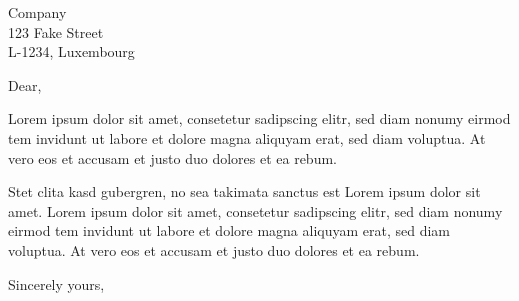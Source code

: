 \documentclass[DIN, pagenumber=false, parskip=half,%
               fromalign=right, 
               fromrule=false,fromlogo]{scrlttr2}
\begin{document}
 
\begin{letter}{ Company \\ 123 Fake Street \\ L-1234, Luxembourg}


\opening{Dear,}

Lorem ipsum dolor sit amet, consetetur sadipscing elitr, sed diam nonumy eirmod tem 
invidunt ut labore et dolore magna aliquyam erat, sed diam voluptua. At vero eos et accusam 
et justo duo dolores et ea rebum. 

Stet clita kasd gubergren, no sea takimata sanctus est Lorem ipsum dolor sit amet. Lorem 
ipsum dolor sit amet, consetetur sadipscing elitr, sed diam nonumy eirmod tem invidunt ut 
labore et dolore magna aliquyam erat, sed diam voluptua. At vero eos et accusam et justo duo 
dolores et ea rebum. 

\closing{Sincerely yours,}




\end{letter}
 
\end{document}
